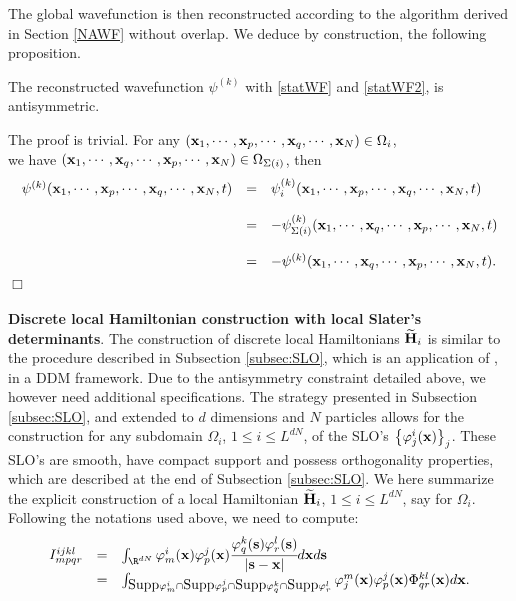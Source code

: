 The global wavefunction is then reconstructed according to the algorithm derived in Section \ref{NAWF} without overlap. We deduce by construction, the following proposition.
\begin{prop}
The reconstructed wavefunction $\psi^{(k)}$ with \eqref{statWF} and \eqref{statWF2}, is antisymmetric.
\end{prop} 
 The proof is trivial. For any $({\bf x}_1,\cdots,{\bf x}_p,\cdots,{\bf x}_q,\cdots,{\bf x}_N) \in \Omega_i$, \\
we have $({\bf x}_1,\cdots,{\bf x}_q,\cdots,{\bf x}_p,\cdots,{\bf x}_N)\in \Omega_{\Sigma(i)}$, then 
\begin{eqnarray*}
\left.
\begin{array}{lcl}
\psi^{(k)}({\bf x}_1,\cdots,{\bf x}_p, \cdots,{\bf x}_q,\cdots, {\bf x}_N,t) & =& \psi_i^{(k)}({\bf x}_1,\cdots,{\bf x}_p, \cdots,{\bf x}_q,\cdots, {\bf x}_N,t)\\
\\
&  = & -\psi_{\Sigma(i)}^{(k)}({\bf x}_1,\cdots,{\bf x}_q, \cdots,{\bf x}_p,\cdots, {\bf x}_N,t)\\
\\
&  =&  -\psi^{(k)}({\bf x}_1,\cdots,{\bf x}_q, \cdots,{\bf x}_p,\cdots, {\bf x}_N,t).
\end{array}
\right.
\end{eqnarray*}
 $\Box$
\\
\\
{\bf Discrete local Hamiltonian construction with local Slater's determinants}. The construction of discrete local Hamiltonians $\widetilde{{\bf H}}_{i}$ is similar to the procedure described in Subsection \ref{subsec:SLO}, which is an application of \cite{CAM15-10}, in a DDM framework. Due to the antisymmetry constraint detailed above, we however need additional specifications. The strategy presented in Subsection \ref{subsec:SLO}, and extended to $d$ dimensions and $N$ particles allows for the construction for any subdomain $\Omega_i$, $1\leq i \leq L^{dN}$, of the SLO's $\big\{\varphi_j^{i}({\bf x})\big\}_{j}$. These SLO's are smooth, have compact support and possess orthogonality properties, which  are described at the end of Subsection \ref{subsec:SLO}. We here summarize the explicit construction of a local Hamiltonian $\widetilde{{\bf H}}_i$, $1 \leq i \leq L^{dN}$, say for $\Omega_i$. Following the notations used above, we need to compute:
\begin{eqnarray*}
\left.
\begin{array}{lcl}
I_{mpqr}^{ijkl} &= &\int_{\R^{dN}} \varphi^i_m({\bf x})\varphi^j_p({\bf x})\cfrac{\varphi^k_q({\bf s})\varphi^l_r({\bf s})}{|{\bf s}-{\bf x}|}d{\bf x}d{\bf s} \\
&= &\int_{\hbox{Supp}\varphi_m^i\cap \hbox{Supp}\varphi_p^j\cap \hbox{Supp}\varphi_q^k\cap \hbox{Supp}\varphi_r^l}\varphi^m_j({\bf x})\varphi^j_p({\bf x})\Phi_{qr}^{kl}({\bf x})d{\bf x}.
\end{array}
\right.
\end{eqnarray*} 
